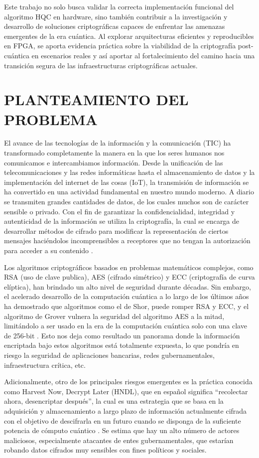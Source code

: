Este trabajo no solo busca validar la correcta implementación funcional del algoritmo HQC en hardware, sino también contribuir a la investigación y desarrollo de soluciones criptográficas capaces de enfrentar las amenazas emergentes de la era cuántica. Al explorar arquitecturas eficientes y reproducibles en FPGA, se aporta evidencia práctica sobre la viabilidad de la criptografía post-cuántica en escenarios reales y así aportar al fortalecimiento del camino hacia una transición segura de las infraestructuras criptográficas actuales.


\newpage
\section{PLANTEAMIENTO DEL PROBLEMA}
El avance de las tecnologías de la información y la comunicación (TIC) ha transformado completamente la manera en la que los seres humanos nos comunicamos e intercambiamos información. Desde la unificación de las telecomunicaciones y las redes informáticas hasta el almacenamiento de datos y la implementación del internet de las cosas (IoT), la transmisión de información se ha convertido en una actividad fundamental en nuestro mundo moderno. A diario se transmiten grandes cantidades de datos, de los cuales muchos son de carácter sensible o privado. Con el fin de garantizar la confidencialidad, integridad y autenticidad de la información se utiliza la criptografía, la cual se encarga de desarrollar métodos de cifrado para modificar la representación de ciertos mensajes haciéndolos incomprensibles a receptores que no tengan la autorización para acceder a su contenido \cite{IBMQuantumSafe2024}.

Los algoritmos criptográficos basados en problemas matemáticos complejos, como RSA (uso de clave publica), AES (cifrado simétrico) y ECC (criptografía de curva elíptica), han brindado un alto nivel de seguridad durante décadas. Sin embargo, el acelerado desarrollo de la computación cuántica a lo largo de los últimos años ha demostrado que algoritmos como el de Shor, puede romper RSA y ECC, y el algoritmo de Grover vulnera la seguridad del algoritmo AES a la mitad, limitándolo a ser usado en la era de la computación cuántica solo con una clave de 256-bit \cite{SinghSakk2024}. Esto nos deja como resultado un panorama donde la información encriptada bajo estos algoritmos está totalmente expuesta, lo que pondría en riesgo la seguridad de aplicaciones bancarias, redes gubernamentales, infraestructura crítica, etc.

Adicionalmente, otro de los principales riesgos emergentes es la práctica conocida como Harvest Now, Decrypt Later (HNDL), que en español significa “recolectar ahora, desencriptar después”, la cual es una estrategia que se basa en la adquisición y almacenamiento a largo plazo de información actualmente cifrada con el objetivo de descifrarla en un futuro cuando se disponga de la suficiente potencia de cómputo cuántico \cite{Olutimehin2025FutureProofing}. Se estima que hay un alto número de actores maliciosos, especialmente atacantes de entes gubernamentales, que estarían robando datos cifrados muy sensibles con fines políticos y sociales.

